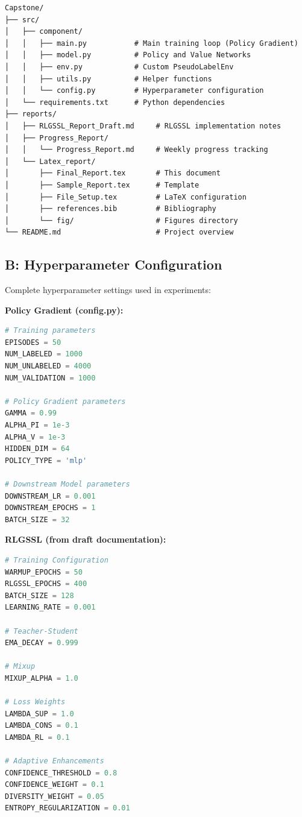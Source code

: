 \documentclass{scrartcl}
\begin{document}
\begin{verbatim}
Capstone/
├── src/
│   ├── component/
│   │   ├── main.py           # Main training loop (Policy Gradient)
│   │   ├── model.py          # Policy and Value Networks
│   │   ├── env.py            # Custom PseudoLabelEnv
│   │   ├── utils.py          # Helper functions
│   │   └── config.py         # Hyperparameter configuration
│   └── requirements.txt      # Python dependencies
├── reports/
│   ├── RLGSSL_Report_Draft.md     # RLGSSL implementation notes
│   ├── Progress_Report/
│   │   └── Progress_Report.md     # Weekly progress tracking
│   └── Latex_report/
│       ├── Final_Report.tex       # This document
│       ├── Sample_Report.tex      # Template
│       ├── File_Setup.tex         # LaTeX configuration
│       ├── references.bib         # Bibliography
│       └── fig/                   # Figures directory
└── README.md                      # Project overview
\end{verbatim}

\subsection{B: Hyperparameter Configuration}

Complete hyperparameter settings used in experiments:

\textbf{Policy Gradient (config.py):}
\begin{lstlisting}[language=Python]
# Training parameters
EPISODES = 50
NUM_LABELED = 1000
NUM_UNLABELED = 4000
NUM_VALIDATION = 1000

# Policy Gradient parameters
GAMMA = 0.99
ALPHA_PI = 1e-3
ALPHA_V = 1e-3
HIDDEN_DIM = 64
POLICY_TYPE = 'mlp'

# Downstream Model parameters
DOWNSTREAM_LR = 0.001
DOWNSTREAM_EPOCHS = 1
BATCH_SIZE = 32
\end{lstlisting}

\textbf{RLGSSL (from draft documentation):}
\begin{lstlisting}[language=Python]
# Training Configuration
WARMUP_EPOCHS = 50
RLGSSL_EPOCHS = 400
BATCH_SIZE = 128
LEARNING_RATE = 0.001

# Teacher-Student
EMA_DECAY = 0.999

# Mixup
MIXUP_ALPHA = 1.0

# Loss Weights
LAMBDA_SUP = 1.0
LAMBDA_CONS = 0.1
LAMBDA_RL = 0.1

# Adaptive Enhancements
CONFIDENCE_THRESHOLD = 0.8
CONFIDENCE_WEIGHT = 0.1
DIVERSITY_WEIGHT = 0.05
ENTROPY_REGULARIZATION = 0.01
\end{lstlisting}
\end{document}
